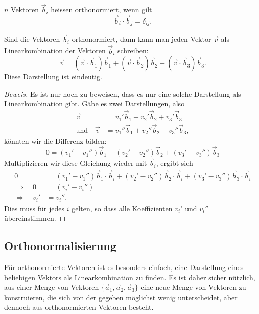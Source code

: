 \begin{definition}
$n$ Vektoren $\vec b_i$ heissen orthonormiert, wenn gilt
\[
\vec b_i\cdot\vec b_j=\delta_{ij}.
\]
\end{definition}

\begin{satz}
Sind die Vektoren $\vec b_i$ orthonormiert, dann kann man jeden
Vektor $\vec v$ als Linearkombination der Vektoren $\vec b_i$ schreiben:
\[
\vec v=
(\vec v\cdot\vec b_1)\vec b_1
+
(\vec v\cdot\vec b_2)\vec b_2
+
(\vec v\cdot\vec b_3)\vec b_3.
\]
Diese Darstellung ist eindeutig.
\end{satz}

\begin{proof}[Beweis]
Es ist nur noch zu beweisen, dass es nur eine solche Darstellung als
Linearkombination gibt.
Gäbe es zwei Darstellungen, also
\begin{align*}
\vec v
&=
v_1'\vec b_1+
v_2'\vec b_2+
v_3'\vec b_3\\
\text{und}\quad
\vec v
&=
v_1''\vec b_1+
v_2''\vec b_2+
v_3''\vec b_3,
\end{align*}
könnten wir die Differenz bilden:
\[
0=
(v_1'-v_1'')\vec b_1
+
(v_2'-v_2'')\vec b_2
+
(v_3'-v_3'')\vec b_3
\]
Multiplizieren wir diese Gleichung wieder mit $\vec{b}_i$, ergibt sich
\begin{align*}
0
&=
(v_1'-v_1'')\vec{b}_1\cdot\vec{b}_i
+
(v_2'-v_2'')\vec{b}_2\cdot\vec{b}_i
+
(v_3'-v_3'')\vec{b}_3\cdot\vec{b}_i
\\
\Rightarrow
\quad
0
&=
(v_i'-v_i'')
\\
\Rightarrow\quad
v_i'&=v_i''.
\end{align*}
Dies muss für jedes $i$ gelten, so dass alle
Koeffizienten $v_i'$ und $v_i''$ übereinstimmen.
\end{proof}

%
%
\subsection{Orthonormalisierung}
Für orthonormierte Vektoren ist es besonders einfach, eine Darstellung
eines beliebigen Vektors als Linearkombination zu finden.
Es ist daher sicher nützlich, aus einer Menge von Vektoren
$\{\vec a_1,\vec a_2,\vec a_3\}$
eine neue Menge von Vektoren zu konstruieren, die sich von der gegeben
möglichst wenig
unterscheidet, aber dennoch aus orthonormierten Vektoren besteht.

